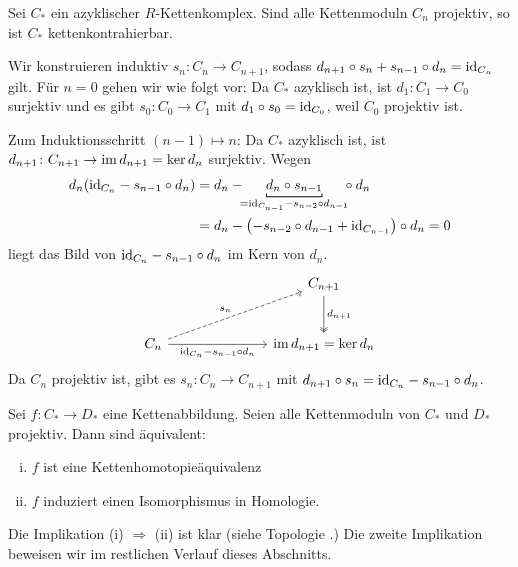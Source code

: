 \begin{satz}[{name=[{azyklische, projektive Kettenkomplexe sind kettenkontrahierbar}]},label=satz:projektiv_azyklisch_kettenkontrahierbar]
	Sei $C_*$ ein azyklischer $R$-Kettenkomplex. Sind alle Kettenmoduln $C_n$ projektiv, so ist $C_*$ kettenkontrahierbar.
\end{satz}
\begin{beweis}
	Wir konstruieren induktiv $s_n \colon C_n \to C_{n+1}$, sodass $d_{n+1} \circ s_n + s_{n-1} \circ d_n = \operatorname{id}_{C_n}$ gilt. 	
	Für $n=0$ gehen wir wie folgt vor: Da $C_*$ azyklisch ist, ist $d_1 \colon C_1 \to C_0$ surjektiv und es gibt $s_0 \colon C_0 \to C_1$ mit $d_1 \circ s_0 = \operatorname{id}_{C_0}$, weil $C_0$ projektiv ist.
	
	Zum Induktionsschritt $(n-1) \mapsto n$: Da $C_*$ azyklisch ist, ist $d_{n+1} \colon C_{n+1} \to \operatorname{im} d_{n+1}=\ker d_n$ surjektiv. Wegen
	\begin{align}
		d_n \enbrace*{{\id_{C_n}} - s_{n-1} \circ d_n} &= d_n - \hspace{-1ex}\Underbracket{d_n \circ s_{n-1}}{={\id_{C_{n-1}}} - s_{n-2} \circ d_{n-1}}\hspace{-1ex} \circ d_n \\
		&= d_n - \enbrace*{- s_{n-2} \circ d_{n-1} + {\id_{C_{n-1}}}} \circ d_n =0
	\end{align}
	liegt das Bild von ${\operatorname{id}_{C_n}} - s_{n-1} \circ d_n$ im Kern von $d_n$.
	\[
		\begin{tikzcd}[column sep=2.5cm,row sep=large]
			\mbox{ } & C_{n+1} \dar["d_{n+1}",two heads] \\
			C_n \urar["s_n", dashed] \rar["{\id_{C_n}} - s_{n-1} \circ d_n"'] & \im d_{n+1} = \ker d_n
		\end{tikzcd}
	\]
	Da $C_n$ projektiv ist, gibt es $s_n \colon C_n \to C_{n+1}$ mit $d_{n+1} \circ s_n = {\operatorname{id}_{C_n}} - {s_{n-1} \circ d_n}$.
\end{beweis}

\begin{satz}[label=satz:5:kettenhomotopie,{name=[{Bei projektiven Kettenmoduln werden Isomorphismen in Homologie immer von Kettenhomotopieäquivalenzen induziert}]}]
	Sei $f \colon C_* \to D_*$ eine Kettenabbildung. Seien alle Kettenmoduln von $C_*$ und $D_*$ projektiv. Dann sind äquivalent: 
	\begin{enumerate}[(i),itemsep=0pt]
		\item $f$ ist eine Kettenhomotopieäquivalenz
		\item $f$ induziert einen Isomorphismus in Homologie.
	\end{enumerate}
\end{satz}
\begin{beweis}
	Die Implikation (i) $\Rightarrow$ (ii) ist klar (siehe Topologie .) 
	Die zweite Implikation beweisen wir im restlichen Verlauf dieses Abschnitts.
\end{beweis}

